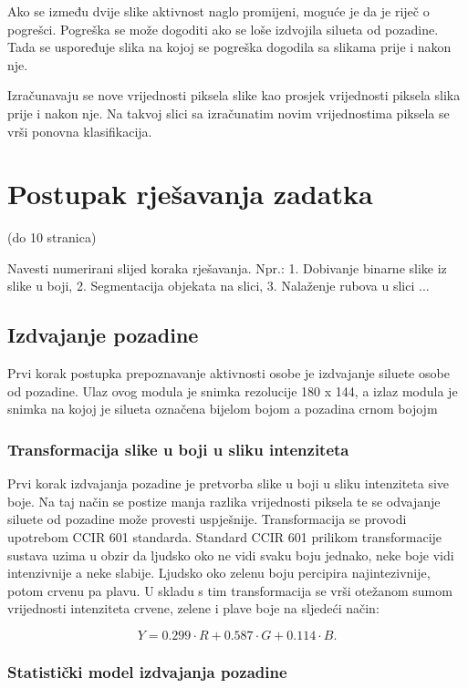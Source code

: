 \documentclass[times, utf8, diplomski]{fer}
\begin{document}
Ako se između dvije slike aktivnost naglo promijeni, moguće je da je riječ o pogrešci.
Pogreška se može dogoditi ako se loše izdvojila silueta od pozadine. Tada se uspoređuje slika
na kojoj se pogreška dogodila sa slikama prije i nakon nje.

 Izračunavaju se nove vrijednosti piksela slike kao prosjek vrijednosti piksela slika prije i nakon nje. Na takvoj slici sa izračunatim novim vrijednostima piksela se vrši ponovna klasifikacija.



\chapter{Postupak rješavanja zadatka}

(do 10 stranica)

Navesti numerirani slijed koraka rješavanja. Npr.: 1. Dobivanje binarne slike iz slike u boji, 2. Segmentacija objekata na slici, 3. Nalaženje rubova u slici ...

\section{Izdvajanje pozadine}

Prvi korak postupka prepoznavanje aktivnosti osobe je izdvajanje siluete osobe od pozadine. Ulaz ovog modula je snimka rezolucije 180 x 144, a izlaz modula je snimka na kojoj je silueta označena bijelom bojom a pozadina crnom bojojm

\subsection{Transformacija slike u boji u sliku intenziteta}

Prvi korak izdvajanja pozadine je pretvorba slike u boji u sliku intenziteta sive boje. Na taj način se postize manja razlika vrijednosti piksela te se odvajanje siluete od pozadine može provesti uspješnije. Transformacija se provodi upotrebom CCIR 601 standarda. Standard CCIR 601 prilikom transformacije sustava uzima u obzir da ljudsko oko ne vidi svaku boju jednako, neke boje vidi intenzivnije a neke slabije. Ljudsko oko zelenu boju percipira najintezivnije, potom crvenu pa plavu. U skladu s tim transformacija se vrši otežanom sumom vrijednosti intenziteta crvene, zelene i plave boje na sljedeći način:

$$ Y = 0.299 \cdot R + 0.587 \cdot G + 0.114 \cdot B. $$

\subsection{Statistički model izdvajanja pozadine}
\end{document}

